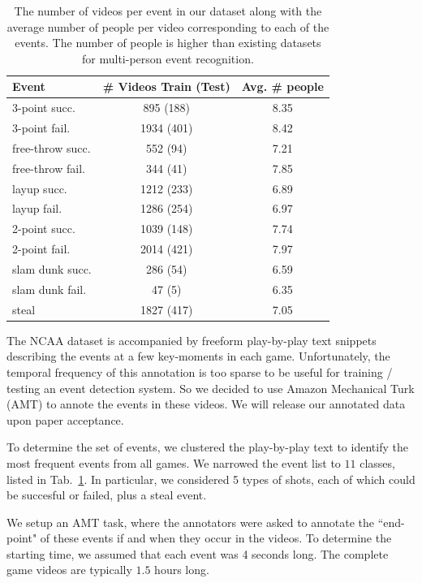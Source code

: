 \begin{table}[ht!]
\begin{center}
\small
 \begin{tabular}{|l|c|c|}
  \hline
  Event          & \# Videos Train (Test) & Avg. \# people \\ \hline \hline
  3-point succ.    & 895 (188) &  8.35 \\ 
  3-point fail.    & 1934 (401) &  8.42 \\ 
  free-throw succ. & 552 (94) &  7.21\\ 
  free-throw fail. & 344 (41) &  7.85\\  
  layup succ.      & 1212 (233) &  6.89\\ 
  layup fail.      & 1286 (254) &  6.97 \\ 
  2-point succ.    & 1039 (148) &  7.74 \\ 
  2-point fail.    & 2014 (421) &  7.97\\ 
  slam dunk succ.  & 286 (54) &  6.59 \\ 
  slam dunk fail.  & 47 (5) &  6.35\\ 
  steal & 1827 (417) & 7.05\\ \hline  
  \end{tabular}
\end{center}
  \caption{The number of videos per event in our dataset along with
  the average number of people per video corresponding to each of the
events. The number of people is higher than existing datasets for
multi-person event recognition.}
  \label{tab:data_dist}
\end{table}

The NCAA dataset is accompanied by freeform play-by-play text snippets
describing the events at a few key-moments in each game.  Unfortunately, the
temporal frequency of this annotation is too sparse to be useful for training /
testing an event detection system.  So we decided to use Amazon Mechanical Turk
(AMT) to annote the events in these videos. We will release our annotated data
upon paper acceptance.

To determine the set of events, we clustered the play-by-play text to identify
the most frequent events from all games. We narrowed the event list to $11$
classes, listed in Tab.~\ref{tab:data_dist}.  In particular, we considered
5 types of shots, each of which could be succesful or failed, plus a steal
event. 

We setup an AMT task, where the annotators were asked to annotate the
``end-point" of these events if and when they occur in the videos.  To
determine the starting time, we assumed that each event was 4 seconds long.
The complete game videos are typically $1.5$ hours long.

